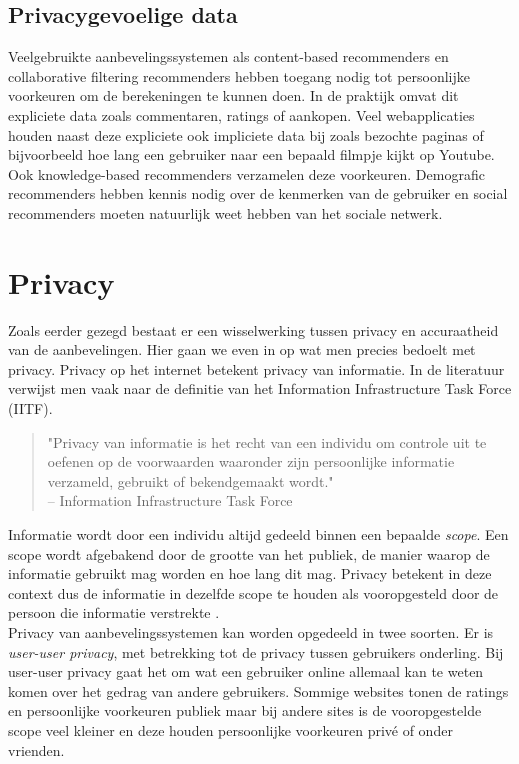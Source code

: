 \subsection{Privacygevoelige data}
Veelgebruikte aanbevelingssystemen als content-based recommenders en collaborative filtering recommenders hebben toegang nodig tot persoonlijke voorkeuren om de berekeningen te kunnen doen. In de praktijk omvat dit expliciete data zoals commentaren, ratings of aankopen. Veel webapplicaties houden naast deze expliciete ook impliciete data bij zoals bezochte paginas of bijvoorbeeld hoe lang een gebruiker naar een bepaald filmpje kijkt op Youtube. Ook knowledge-based recommenders verzamelen deze voorkeuren. Demografic recommenders hebben kennis nodig over de kenmerken van de gebruiker en social recommenders moeten natuurlijk weet hebben van het sociale netwerk.



\section{Privacy}
\label{sec:privacy}
Zoals eerder gezegd bestaat er een wisselwerking tussen privacy en accuraatheid van de aanbevelingen. Hier gaan we even in op wat men precies bedoelt met privacy. Privacy op het internet betekent privacy van informatie. In de literatuur verwijst men vaak naar de definitie van het Information Infrastructure Task Force (IITF).

 \begin{quotation}
"Privacy van informatie is het recht van een individu om controle uit te oefenen op de voorwaarden waaronder zijn persoonlijke informatie verzameld, gebruikt of bekendgemaakt wordt." \\-- Information Infrastructure Task Force \cite{pirs}
 \end{quotation}
Informatie wordt door een individu altijd gedeeld binnen een bepaalde \textit{scope}. Een scope wordt afgebakend door de grootte van het publiek, de manier waarop de informatie gebruikt mag worden en hoe lang dit mag.  Privacy betekent in deze context dus de informatie in dezelfde scope te houden als vooropgesteld door de persoon die informatie verstrekte \cite{pirs}.\\
Privacy van aanbevelingssystemen kan worden opgedeeld in twee soorten. Er is \textit{user-user privacy}, met betrekking tot de privacy tussen gebruikers onderling. Bij user-user privacy gaat het om wat een gebruiker online allemaal kan te weten komen over het gedrag van andere gebruikers. Sommige websites tonen de ratings en persoonlijke voorkeuren publiek maar bij andere sites is de vooropgestelde scope veel kleiner en deze houden persoonlijke voorkeuren priv\'e of onder vrienden.  

